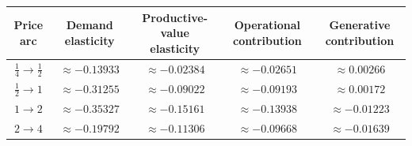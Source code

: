 \begin{tabular}{@{}ccccc@{}}
\toprule
Price arc & Demand elasticity & Productive-value elasticity & Operational contribution & Generative contribution \\
\midrule
\(\frac14\to\frac12\) & \(\approx-0.13933\) & \(\approx-0.02384\) & \(\approx-0.02651\) & \(\approx0.00266\) \\
\(\frac12\to1\) & \(\approx-0.31255\) & \(\approx-0.09022\) & \(\approx-0.09193\) & \(\approx0.00172\) \\
\(1\to2\) & \(\approx-0.35327\) & \(\approx-0.15161\) & \(\approx-0.13938\) & \(\approx-0.01223\) \\
\(2\to4\) & \(\approx-0.19792\) & \(\approx-0.11306\) & \(\approx-0.09668\) & \(\approx-0.01639\) \\
\bottomrule
\end{tabular}
